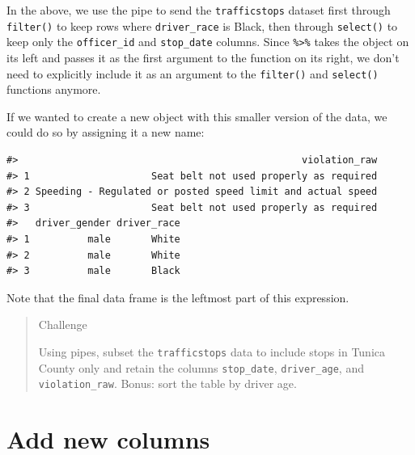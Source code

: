 \documentclass[]{book}
\newenvironment{Shaded}{\begin{snugshade}}{\end{snugshade}}
\newcommand{\KeywordTok}[1]{\textcolor[rgb]{0.13,0.29,0.53}{\textbf{#1}}}
\newcommand{\DecValTok}[1]{\textcolor[rgb]{0.00,0.00,0.81}{#1}}
\newcommand{\StringTok}[1]{\textcolor[rgb]{0.31,0.60,0.02}{#1}}
\newcommand{\OperatorTok}[1]{\textcolor[rgb]{0.81,0.36,0.00}{\textbf{#1}}}
\newcommand{\NormalTok}[1]{#1}
\theoremstyle{definition}
\theoremstyle{definition}
\theoremstyle{definition}
\theoremstyle{remark}
\begin{document}
In the above, we use the pipe to send the \texttt{trafficstops} dataset
first through \texttt{filter()} to keep rows where \texttt{driver\_race}
is Black, then through \texttt{select()} to keep only the
\texttt{officer\_id} and \texttt{stop\_date} columns. Since
\texttt{\%\textgreater{}\%} takes the object on its left and passes it
as the first argument to the function on its right, we don't need to
explicitly include it as an argument to the \texttt{filter()} and
\texttt{select()} functions anymore.

If we wanted to create a new object with this smaller version of the
data, we could do so by assigning it a new name:

\begin{Shaded}
\end{Shaded}

\begin{verbatim}
#>                                                 violation_raw
#> 1                     Seat belt not used properly as required
#> 2 Speeding - Regulated or posted speed limit and actual speed
#> 3                     Seat belt not used properly as required
#>   driver_gender driver_race
#> 1          male       White
#> 2          male       White
#> 3          male       Black
\end{verbatim}

Note that the final data frame is the leftmost part of this expression.

\begin{quote}
Challenge

Using pipes, subset the \texttt{trafficstops} data to include stops in
Tunica County only and retain the columns \texttt{stop\_date},
\texttt{driver\_age}, and \texttt{violation\_raw}. Bonus: sort the table
by driver age.
\end{quote}

\section{Add new columns}\label{add-new-columns}
\end{document}
